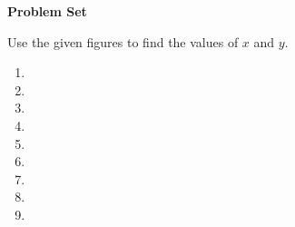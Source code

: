 \def\currentdir{/storage/emulated/0/Documents/documents/latex/1920/Grade-10/2nd/radii-and-chords}

\textbf{Problem Set}

\vspce

Use the given figures to find the values of $x$ and $y$.
\begin{enumerate}[label = \arabic*. ]
\item \hspce  
\item \hspce 
\item \hspce 
\item \hspce 
\item \hspce 
\item \hspce 
\item \hspce 
\item \hspce 
\item \hspce 

\end{enumerate}     